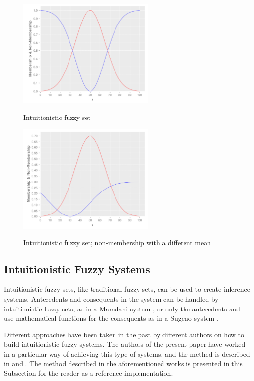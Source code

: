 \documentclass[review]{elsarticle}
\begin{document}
\begin{figure}
\caption{Intuitionistic fuzzy set}
\centering
\includegraphics[width=0.6\textwidth]{img/fs-as-ifs.pdf}
\label{figure:agent-based-model}
\end{figure}

\begin{figure}
\caption{Intuitionistic fuzzy set; non-membership with a different mean}
\centering
\includegraphics[width=0.6\textwidth]{img/ifs-diff-mu-sd.pdf}
\label{figure:agent-based-model}
\end{figure}

\subsection{Intuitionistic Fuzzy Systems}
\label{subsection:intuitionistic-fuzzy-systems}

Intuitionistic fuzzy sets, like traditional fuzzy sets, can be used to create inference systems. Antecedents and consequents in the system can be handled by intuitionistic fuzzy sets, as in a Mamdani system \cite{Mamdani1975}, or only the antecedents and use mathematical functions for the consequents as in a Sugeno system \cite{Takagi1985}.

Different approaches have been taken in the past by different authors on how to build intuitionistic fuzzy systems. The authors of the present paper have worked in a particular way of achieving this type of systems, and the method is described in \cite{Hernandez-Aguila2016} and \cite{Hernandez-Aguila2017-2}. The method described in the aforementioned works is presented in this Subsection for the reader as a reference implementation.
\end{document}
